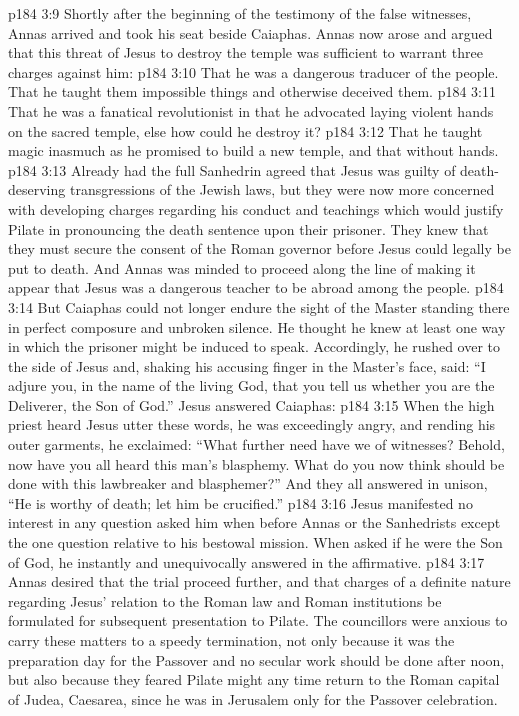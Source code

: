 \vs p184 3:9 Shortly after the beginning of the testimony of the false witnesses, Annas arrived and took his seat beside Caiaphas. Annas now arose and argued that this threat of Jesus to destroy the temple was sufficient to warrant three charges against him:
\vs p184 3:10 \bibnobreakspace That he was a dangerous traducer of the people. That he taught them impossible things and otherwise deceived them.
\vs p184 3:11 \bibnobreakspace That he was a fanatical revolutionist in that he advocated laying violent hands on the sacred temple, else how could he destroy it?
\vs p184 3:12 \bibnobreakspace That he taught magic inasmuch as he promised to build a new temple, and that without hands.
\vs p184 3:13 \pc Already had the full Sanhedrin agreed that Jesus was guilty of death\hyp{}deserving transgressions of the Jewish laws, but they were now more concerned with developing charges regarding his conduct and teachings which would justify Pilate in pronouncing the death sentence upon their prisoner. They knew that they must secure the consent of the Roman governor before Jesus could legally be put to death. And Annas was minded to proceed along the line of making it appear that Jesus was a dangerous teacher to be abroad among the people.
\vs p184 3:14 But Caiaphas could not longer endure the sight of the Master standing there in perfect composure and unbroken silence. He thought he knew at least one way in which the prisoner might be induced to speak. Accordingly, he rushed over to the side of Jesus and, shaking his accusing finger in the Master’s face, said: “I adjure you, in the name of the living God, that you tell us whether you are the Deliverer, the Son of God.” Jesus answered Caiaphas: 
\vs p184 3:15 When the high priest heard Jesus utter these words, he was exceedingly angry, and rending his outer garments, he exclaimed: “What further need have we of witnesses? Behold, now have you all heard this man’s blasphemy. What do you now think should be done with this lawbreaker and blasphemer?” And they all answered in unison, “He is worthy of death; let him be crucified.”
\vs p184 3:16 Jesus manifested no interest in any question asked him when before Annas or the Sanhedrists except the one question relative to his bestowal mission. When asked if he were the Son of God, he instantly and unequivocally answered in the affirmative.
\vs p184 3:17 Annas desired that the trial proceed further, and that charges of a definite nature regarding Jesus’ relation to the Roman law and Roman institutions be formulated for subsequent presentation to Pilate. The councillors were anxious to carry these matters to a speedy termination, not only because it was the preparation day for the Passover and no secular work should be done after noon, but also because they feared Pilate might any time return to the Roman capital of Judea, Caesarea, since he was in Jerusalem only for the Passover celebration.
